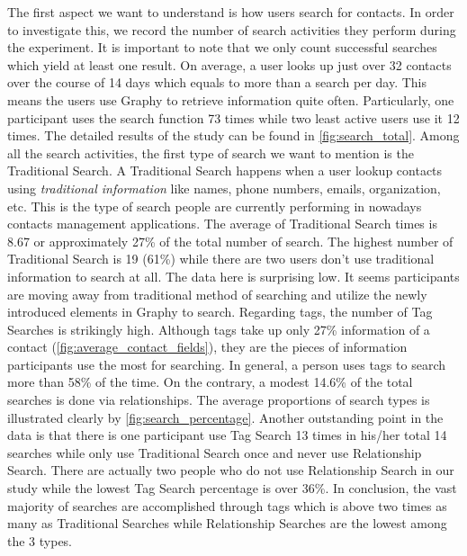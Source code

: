 The first aspect we want to understand is how users search for contacts. In order to investigate this, we record the number of search activities they perform during the experiment. It is important to note that we only count successful searches which yield at least one result. On average, a user looks up just over 32 contacts over the course of 14 days which equals to more than a search per day. This means the users use Graphy to retrieve information quite often. Particularly, one participant uses the search function 73 times while two least active users use it 12 times. The detailed results of the study can be found in \autoref{fig:search_total}. Among all the search activities, the first type of search we want to mention is the Traditional Search. A Traditional Search happens when a user lookup contacts using \textit{traditional information} like names, phone numbers, emails, organization, etc. This is the type of search people are currently performing in nowadays contacts management applications. The average of Traditional Search times is 8.67 or approximately 27\% of the total number of search. The highest number of Traditional Search is 19 (61\%) while there are two users don't use traditional information to search at all. The data here is surprising low. It seems participants are moving away from traditional method of searching and utilize the newly introduced elements in Graphy to search. Regarding tags, the number of Tag Searches is strikingly high. Although tags take up only 27\% information of a contact (\autoref{fig:average_contact_fields}), they are the pieces of information participants use the most for searching. In general, a person uses tags to search more than 58\% of the time. On the contrary, a modest 14.6\% of the total searches is done via relationships. The average proportions of search types is illustrated clearly by \autoref{fig:search_percentage}. Another outstanding point in the data is that there is one participant use Tag Search 13 times in his/her total 14 searches while only use Traditional Search once and never use Relationship Search. There are actually two people who do not use Relationship Search in our study while the lowest Tag Search percentage is over 36\%. In conclusion, the vast majority of searches are accomplished through tags which is above two times as many as Traditional Searches while Relationship Searches are the lowest among the 3 types.

